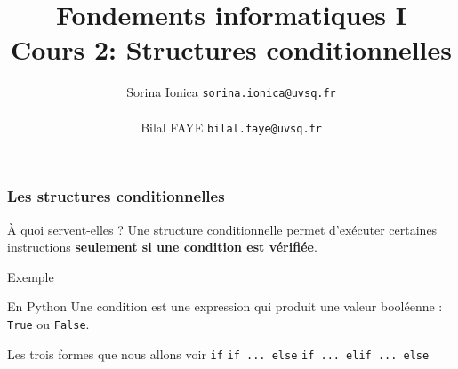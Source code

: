 \documentclass[10pt]{beamer}
\title[IN100 Cours 2]{\textbf{Fondements informatiques I}\\
Cours 2: Structures conditionnelles}
\author[]{Sorina Ionica \texttt{sorina.ionica@uvsq.fr} \\~\\Bilal FAYE  \texttt{bilal.faye@uvsq.fr} }
\institute{}
\date{}
\begin{document}
\frame{\titlepage}



\begin{frame}[containsverbatim]
	\frametitle{Les structures conditionnelles}
	
	\begin{block}{À quoi servent-elles ?}
		Une structure conditionnelle permet d'exécuter certaines instructions
		\textbf{seulement si une condition est vérifiée}.
	\end{block}
	
	\vspace{0.25cm}
	
	
	\begin{exampleblock}{Exemple}
		\begin{center}
			
			\vspace{0.1cm}
			
		\end{center}
	\end{exampleblock}

	
	\vspace{0.25cm}
	
	\begin{block}{En Python}
		Une condition est une expression qui produit une valeur booléenne :
		\texttt{True} ou \texttt{False}.
	\end{block}
	
	\vspace{0.2cm}
	
	\begin{exampleblock}{Les trois formes que nous allons voir}
		\centering
		\texttt{if}
		\qquad
		\texttt{if ... else}
		\qquad
		\texttt{if ... elif ... else}
	\end{exampleblock}
	
\end{frame}
\end{document}
